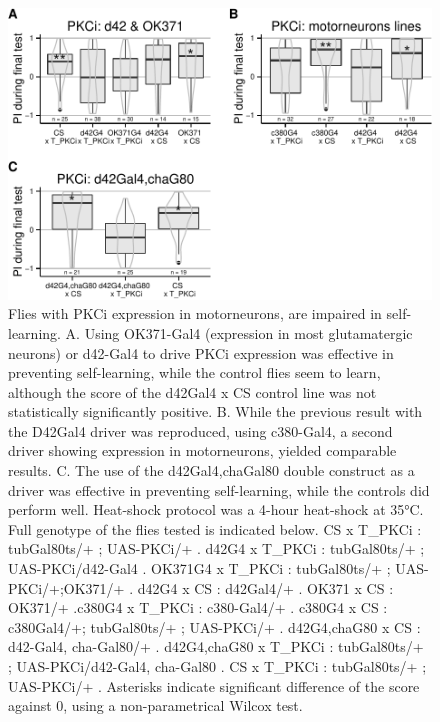 \documentclass[]{article}
\begin{document}
\begin{figure}[htbp]
\centering
\includegraphics{firsttest_files/figure-latex/unnamed-chunk-4-1.pdf}
\caption{\label{fig:motoneurons} Flies with PKCi expression in
motorneurons, are impaired in self-learning. A. Using OK371-Gal4
(expression in most glutamatergic neurons) or d42-Gal4 to drive PKCi
expression was effective in preventing self-learning, while the control
flies seem to learn, although the score of the d42Gal4 x CS control line
was not statistically significantly positive. B. While the previous
result with the D42Gal4 driver was reproduced, using c380-Gal4, a second
driver showing expression in motorneurons, yielded comparable results.
C. The use of the d42Gal4,chaGal80 double construct as a driver was
effective in preventing self-learning, while the controls did perform
well. Heat-shock protocol was a 4-hour heat-shock at 35°C. Full genotype
of the flies tested is indicated below. CS x T\_PKCi : tubGal80ts/+ ;
UAS-PKCi/+ . d42G4 x T\_PKCi : tubGal80ts/+ ; UAS-PKCi/d42-Gal4 .
OK371G4 x T\_PKCi : tubGal80ts/+ ; UAS-PKCi/+;OK371/+ . d42G4 x CS :
d42Gal4/+ . OK371 x CS : OK371/+ .c380G4 x T\_PKCi : c380-Gal4/+ .
c380G4 x CS : c380Gal4/+; tubGal80ts/+ ; UAS-PKCi/+ . d42G4,chaG80 x CS
: d42-Gal4, cha-Gal80/+ . d42G4,chaG80 x T\_PKCi : tubGal80ts/+ ;
UAS-PKCi/d42-Gal4, cha-Gal80 . CS x T\_PKCi : tubGal80ts/+ ; UAS-PKCi/+
. Asterisks indicate significant difference of the score against 0,
using a non-parametrical Wilcox test.}
\end{figure}
\end{document}
